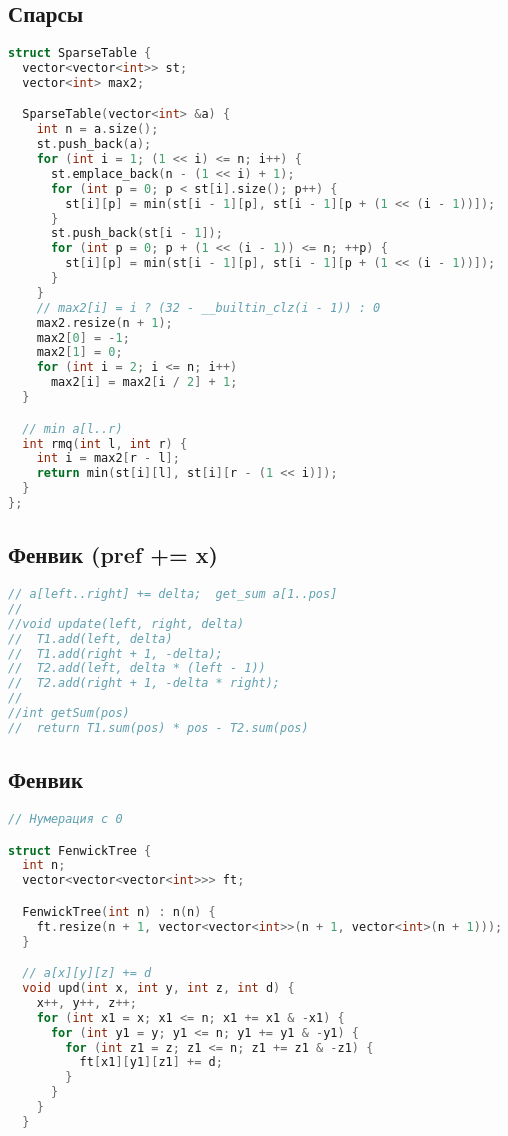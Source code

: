 \documentclass[10pt,a4paper,landscape,twosided]{extarticle}
\begin{document}
\begin{multicols*}{3}
\begin{lstlisting}[language=C++]
\end{lstlisting}

\subsection{Спарсы}
\begin{lstlisting}[language=C++]
struct SparseTable {
  vector<vector<int>> st;
  vector<int> max2;

  SparseTable(vector<int> &a) {
    int n = a.size();
    st.push_back(a);
    for (int i = 1; (1 << i) <= n; i++) {
      st.emplace_back(n - (1 << i) + 1);
      for (int p = 0; p < st[i].size(); p++) {
        st[i][p] = min(st[i - 1][p], st[i - 1][p + (1 << (i - 1))]);
      }
      st.push_back(st[i - 1]);
      for (int p = 0; p + (1 << (i - 1)) <= n; ++p) {
        st[i][p] = min(st[i - 1][p], st[i - 1][p + (1 << (i - 1))]);
      }
    }
    // max2[i] = i ? (32 - __builtin_clz(i - 1)) : 0
    max2.resize(n + 1);
    max2[0] = -1;
    max2[1] = 0;
    for (int i = 2; i <= n; i++)
      max2[i] = max2[i / 2] + 1;
  }

  // min a[l..r)
  int rmq(int l, int r) {
    int i = max2[r - l];
    return min(st[i][l], st[i][r - (1 << i)]);
  }
};
\end{lstlisting}

\subsection{Фенвик (pref += x)}
\begin{lstlisting}[language=C++]
// a[left..right] += delta;  get_sum a[1..pos]
//
//void update(left, right, delta)
//  T1.add(left, delta)
//  T1.add(right + 1, -delta);
//  T2.add(left, delta * (left - 1))
//  T2.add(right + 1, -delta * right);
//
//int getSum(pos)
//  return T1.sum(pos) * pos - T2.sum(pos)

\end{lstlisting}

\subsection{Фенвик}
\begin{lstlisting}[language=C++]
// Нумерация с 0

struct FenwickTree {
  int n;
  vector<vector<vector<int>>> ft;

  FenwickTree(int n) : n(n) {
    ft.resize(n + 1, vector<vector<int>>(n + 1, vector<int>(n + 1)));
  }

  // a[x][y][z] += d
  void upd(int x, int y, int z, int d) {
    x++, y++, z++;
    for (int x1 = x; x1 <= n; x1 += x1 & -x1) {
      for (int y1 = y; y1 <= n; y1 += y1 & -y1) {
        for (int z1 = z; z1 <= n; z1 += z1 & -z1) {
          ft[x1][y1][z1] += d;
        }
      }
    }
  }


\end{lstlisting}
\end{multicols*}
\end{document}
